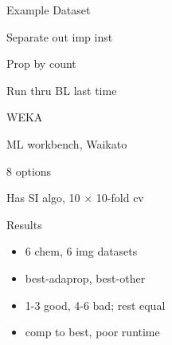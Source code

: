 \documentclass[12pt,handout]{beamer}
\newenvironment{wideitemize}{\itemize\addtolength{\itemsep}{20pt}}{\enditemize}
\begin{document}
\begin{frame}{Example Dataset}
\begin{wideitemize}
    \item Separate out imp inst
    \item Prop by count
    \item Run thru BL last time
\end{wideitemize}
\end{frame}


\begin{frame}{WEKA}
\begin{wideitemize}
    \item ML workbench, Waikato
    \item 8 options
    \item Has SI algo, 10 $\times$ 10-fold cv
\end{wideitemize}
\end{frame}


\begin{frame}{Results}
\begin{itemize}
    \item 6 chem, 6 img datasets
    \item best-adaprop, best-other
    \item 1-3 good, 4-6 bad; rest equal
    \item comp to best, poor runtime
\end{itemize}
\end{frame}
\end{document}
